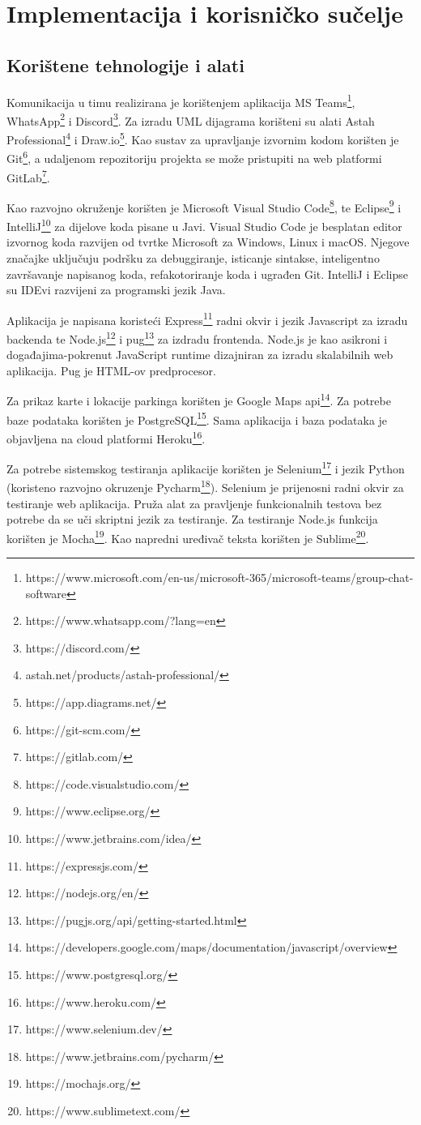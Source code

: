 \chapter{Implementacija i korisničko sučelje}
		
		
		\section{Korištene tehnologije i alati}
			
			Komunikacija u timu realizirana je korištenjem aplikacija MS Teams\footnote{https://www.microsoft.com/en-us/microsoft-365/microsoft-teams/group-chat-software}, WhatsApp\footnote{https://www.whatsapp.com/?lang=en} i Discord\footnote{https://discord.com/}. Za izradu UML dijagrama korišteni su alati Astah Professional\footnote{astah.net/products/astah-professional/} i Draw.io\footnote{https://app.diagrams.net/}. Kao sustav za upravljanje izvornim kodom korišten je Git\footnote{https://git-scm.com/}, a udaljenom repozitoriju projekta se može pristupiti na web platformi GitLab\footnote{https://gitlab.com/}.
			
			Kao razvojno okruženje korišten je Microsoft Visual Studio Code\footnote{https://code.visualstudio.com/}, te Eclipse\footnote{https://www.eclipse.org/} i IntelliJ\footnote{https://www.jetbrains.com/idea/} za dijelove koda pisane u Javi. Visual Studio Code je besplatan editor izvornog koda razvijen od tvrtke Microsoft za Windows, Linux i macOS. Njegove značajke uključuju podršku za debuggiranje, isticanje sintakse, inteligentno završavanje napisanog koda, refakotoriranje koda i ugrađen Git. IntelliJ i Eclipse su IDEvi razvijeni za programski jezik Java.
			
			Aplikacija je napisana koristeći Express\footnote{https://expressjs.com/} radni okvir i jezik Javascript za izradu backenda te Node.js\footnote{https://nodejs.org/en/} i pug\footnote{https://pugjs.org/api/getting-started.html} za izdradu frontenda. Node.js je kao asikroni i događajima-pokrenut JavaScript runtime dizajniran za izradu skalabilnih web aplikacija. Pug je HTML-ov predprocesor.
			
			Za prikaz karte i lokacije parkinga korišten je Google Maps api\footnote{https://developers.google.com/maps/documentation/javascript/overview}. Za potrebe baze podataka korišten je PostgreSQL\footnote{https://www.postgresql.org/}. Sama aplikacija i baza podataka je objavljena na cloud platformi Heroku\footnote{https://www.heroku.com/}.
			
			Za potrebe sistemskog testiranja aplikacije korišten je Selenium\footnote{https://www.selenium.dev/} i jezik Python (koristeno razvojno okruzenje Pycharm\footnote{https://www.jetbrains.com/pycharm/}). Selenium je prijenosni radni okvir za testiranje web aplikacija. Pruža alat za pravljenje funkcionalnih testova bez potrebe da se uči skriptni jezik za testiranje.\newline
			Za testiranje Node.js funkcija korišten je Mocha\footnote{https://mochajs.org/}. Kao napredni uređivač teksta korišten je Sublime\footnote{https://www.sublimetext.com/}.
			
